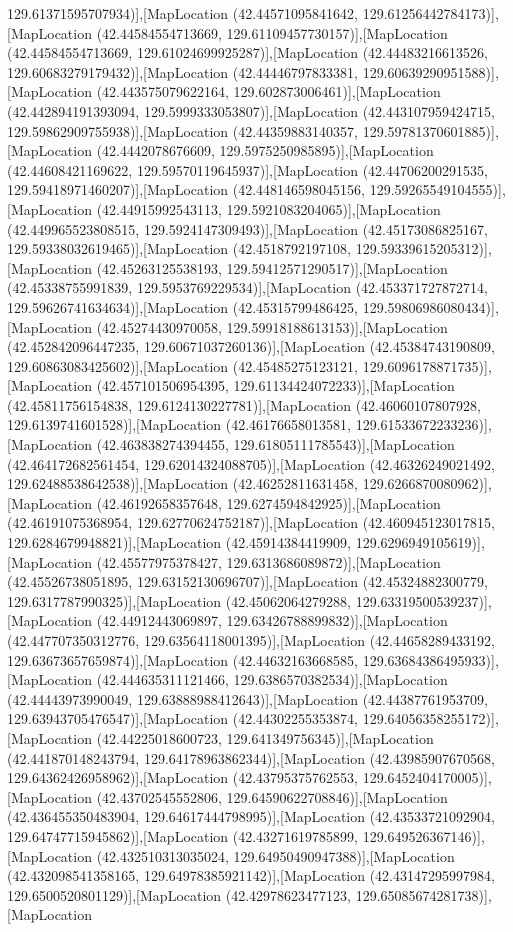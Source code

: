 129.61371595707934)],[MapLocation (42.44571095841642, 129.61256442784173)],[MapLocation (42.44584554713669, 129.61109457730157)],[MapLocation (42.44584554713669, 129.61024699925287)],[MapLocation (42.44483216613526, 129.60683279179432)],[MapLocation (42.44446797833381, 129.60639290951588)],[MapLocation (42.443575079622164, 129.602873006461)],[MapLocation (42.442894191393094, 129.5999333053807)],[MapLocation (42.443107959424715, 129.59862909755938)],[MapLocation (42.44359883140357, 129.59781370601885)],[MapLocation (42.4442078676609, 129.5975250985895)],[MapLocation (42.44608421169622, 129.59570119645937)],[MapLocation (42.44706200291535, 129.59418971460207)],[MapLocation (42.448146598045156, 129.59265549104555)],[MapLocation (42.44915992543113, 129.5921083204065)],[MapLocation (42.449965523808515, 129.5924147309493)],[MapLocation (42.45173086825167, 129.59338032619465)],[MapLocation (42.4518792197108, 129.59339615205312)],[MapLocation (42.45263125538193, 129.59412571290517)],[MapLocation (42.45338755991839, 129.5953769229534)],[MapLocation (42.453371727872714, 129.59626741634634)],[MapLocation (42.45315799486425, 129.59806986080434)],[MapLocation (42.45274430970058, 129.59918188613153)],[MapLocation (42.452842096447235, 129.60671037260136)],[MapLocation (42.45384743190809, 129.60863083425602)],[MapLocation (42.45485275123121, 129.6096178871735)],[MapLocation (42.457101506954395, 129.61134424072233)],[MapLocation (42.45811756154838, 129.6124130227781)],[MapLocation (42.46060107807928, 129.6139741601528)],[MapLocation (42.46176658013581, 129.61533672233236)],[MapLocation (42.463838274394455, 129.61805111785543)],[MapLocation (42.464172682561454, 129.62014324088705)],[MapLocation (42.46326249021492, 129.62488538642538)],[MapLocation (42.46252811631458, 129.6266870080962)],[MapLocation (42.46192658357648, 129.6274594842925)],[MapLocation (42.46191075368954, 129.62770624752187)],[MapLocation (42.460945123017815, 129.6284679948821)],[MapLocation (42.45914384419909, 129.6296949105619)],[MapLocation (42.45577975378427, 129.6313686089872)],[MapLocation (42.45526738051895, 129.63152130696707)],[MapLocation (42.45324882300779, 129.6317787990325)],[MapLocation (42.45062064279288, 129.63319500539237)],[MapLocation (42.44912443069897, 129.63426788899832)],[MapLocation (42.447707350312776, 129.63564118001395)],[MapLocation (42.44658289433192, 129.63673657659874)],[MapLocation (42.44632163668585, 129.63684386495933)],[MapLocation (42.444635311121466, 129.6386570382534)],[MapLocation (42.44443973990049, 129.63888988412643)],[MapLocation (42.44387761953709, 129.63943705476547)],[MapLocation (42.44302255353874, 129.64056358255172)],[MapLocation (42.44225018600723, 129.641349756345)],[MapLocation (42.441870148243794, 129.64178963862344)],[MapLocation (42.43985907670568, 129.64362426958962)],[MapLocation (42.43795375762553, 129.6452404170005)],[MapLocation (42.43702545552806, 129.64590622708846)],[MapLocation (42.436455350483904, 129.64617444798995)],[MapLocation (42.43533721092904, 129.64747715945862)],[MapLocation (42.43271619785899, 129.649526367146)],[MapLocation (42.432510313035024, 129.64950490947388)],[MapLocation (42.432098541358165, 129.64978385921142)],[MapLocation (42.43147295997984, 129.6500520801129)],[MapLocation (42.42978623477123, 129.65085674281738)],[MapLocation 